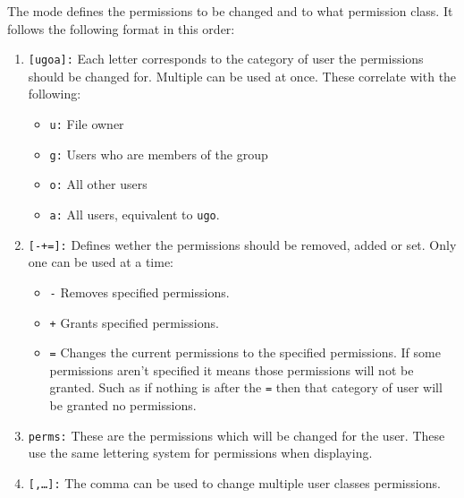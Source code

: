 \documentclass{report}
\begin{document}
    The mode defines the permissions to be changed and to what permission class. It follows the following format in this order:
    \begin{enumerate}
      \item \texttt{[ugoa]:} Each letter corresponds to the category of user the permissions should be changed for. Multiple can be used at once. These correlate with the following:
      \begin{itemize}
         \item \texttt{u:} File owner
         \item \texttt{g:} Users who are members of the group
         \item \texttt{o:} All other users
         \item \texttt{a:} All users, equivalent to \texttt{ugo}.
      \end{itemize}
      \item \texttt{[-+=]:} Defines wether the permissions should be removed, added or set. Only one can be used at a time:
      \begin{itemize}
         \item \texttt{-} Removes specified permissions.
         \item \texttt{+} Grants specified permissions.
         \item \texttt{=} Changes the current permissions to the specified permissions. If some permissions aren't specified it means those permissions will not be granted. Such as if nothing is after the \texttt{=} then that category of user will be granted no permissions.
      \end{itemize}
      \item \texttt{perms:} These are the permissions which will be changed for the user. These use the same lettering system for permissions when displaying. 
      \item \texttt{[,\dots]:} The comma can be used to change multiple user classes permissions.
    \end{enumerate}

\vspace{-.4cm}
 
\end{document}
